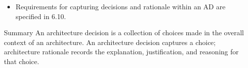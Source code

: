\documentclass[10pt,letterpaper]{article}
\begin{document}
\begin{CornellNotesTable}
{\begin{itemize}[leftmargin=*,nosep,topsep=1pt]
\item Requirements for capturing decisions and rationale within an AD are specified in 6.10.
\end{itemize}}
\end{CornellNotesTable}


\begin{CornellSummaryBox}{Summary}
An architecture decision is a collection of choices made in the overall context of an architecture. An architecture decision captures a choice; architecture rationale records the explanation, justification, and reasoning for that choice.
\end{CornellSummaryBox}
\end{document}
